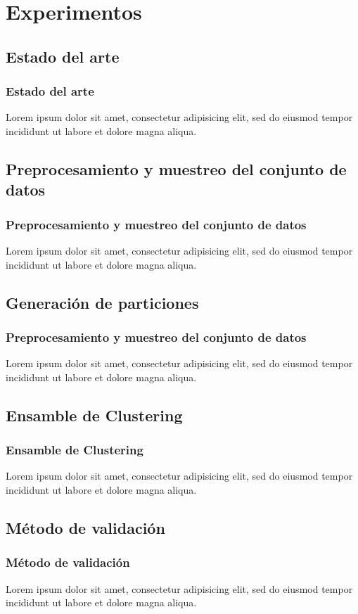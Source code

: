 \section{Experimentos}

\subsection{Estado del arte}
\begin{frame}[allowframebreaks]
	\frametitle{Estado del arte}
	Lorem ipsum dolor sit amet, consectetur adipisicing elit, sed do eiusmod tempor incididunt ut labore et dolore magna aliqua.
\end{frame}

\subsection{Preprocesamiento y muestreo del conjunto de datos}
\begin{frame}[allowframebreaks]
	\frametitle{Preprocesamiento y muestreo del conjunto de datos}
	Lorem ipsum dolor sit amet, consectetur adipisicing elit, sed do eiusmod tempor incididunt ut labore et dolore magna aliqua.
\end{frame}

\subsection{Generación de particiones}
\begin{frame}[allowframebreaks]
	\frametitle{Preprocesamiento y muestreo del conjunto de datos}
	Lorem ipsum dolor sit amet, consectetur adipisicing elit, sed do eiusmod tempor incididunt ut labore et dolore magna aliqua.
\end{frame}

\subsection{Ensamble de Clustering}
\begin{frame}[allowframebreaks]
	\frametitle{Ensamble de Clustering}
	Lorem ipsum dolor sit amet, consectetur adipisicing elit, sed do eiusmod tempor incididunt ut labore et dolore magna aliqua.
\end{frame}

\subsection{Método de validación}
\begin{frame}[allowframebreaks]
	\frametitle{Método de validación}
	Lorem ipsum dolor sit amet, consectetur adipisicing elit, sed do eiusmod tempor incididunt ut labore et dolore magna aliqua.
\end{frame}